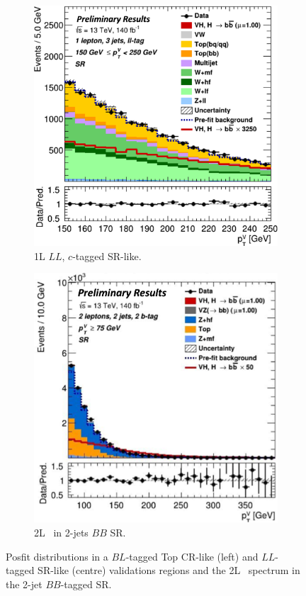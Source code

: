 \begin{figure}[h!]
\begin{subfigure}[b]{0.32\textwidth}
        \includegraphics[width=\textwidth]{Images/VH/Fit/fromSlides/Postfit/1L_LLSR.png}
        \caption{1L $LL$, $c$-tagged SR-like.}
        \label{fig:val_LLSR}
    \end{subfigure}
    \begin{subfigure}[b]{0.32\textwidth}
      \centering
      \includegraphics[width=\textwidth]{Images/VH/Fit/fromSlides/Postfit/2LBB.png}
      \caption{2L \ptv\ in 2-jets $BB$ SR.}
      \label{fig:fit_ptv2L}
    \end{subfigure} 
    \caption{Posfit distributions in a $BL$-tagged Top CR-like (left) and $LL$-tagged SR-like (centre) validations regions and the 2L \ptv\ spectrum in the 2-jet $BB$-tagged SR.}
    \label{fig:postfitval}
\end{figure} 


